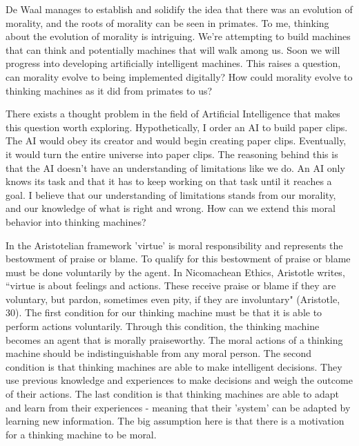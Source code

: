 \documentclass[11pt]{article}
\begin{document}
\par De Waal manages to establish and solidify the idea that there was an evolution of morality, and the roots of morality can be seen in primates. To me, thinking about the evolution of morality is intriguing. We're attempting to build machines that can think and potentially machines that will walk among us. Soon we will progress into developing artificially intelligent machines. This raises a question, can morality evolve to being implemented digitally? How could morality evolve to thinking machines as it did from primates to us?

\par There exists a thought problem in the field of Artificial Intelligence that makes this question worth exploring. Hypothetically, I order an AI to build paper clips. The AI would obey its creator and would begin creating paper clips. Eventually, it would turn the entire universe into paper clips. The reasoning behind this is that the AI doesn't have an understanding of limitations like we do. An AI only knows its task and that it has to keep working on that task until it reaches a goal. I believe that our understanding of limitations stands from our morality, and our knowledge of what is right and wrong. How can we extend this moral behavior into thinking machines?

\par In the Aristotelian framework 'virtue' is moral responsibility and represents the bestowment of praise or blame. To qualify for this bestowment of praise or blame must be done voluntarily by the agent. In Nicomachean Ethics, Aristotle writes, ``virtue is about feelings and actions. These receive praise or blame if they are voluntary, but pardon, sometimes even pity, if they are involuntary" (Aristotle, 30). The first condition for our thinking machine must be that it is able to perform actions voluntarily. Through this condition, the thinking machine becomes an agent that is morally praiseworthy. The moral actions of a thinking machine should be indistinguishable from any moral person. The second condition is that thinking machines are able to make intelligent decisions. They use previous knowledge and experiences to make decisions and weigh the outcome of their actions. The last condition is that thinking machines are able to adapt and learn from their experiences - meaning that their 'system' can be adapted by learning new information. The big assumption here is that there is a motivation for a thinking machine to be moral.
\end{document}
